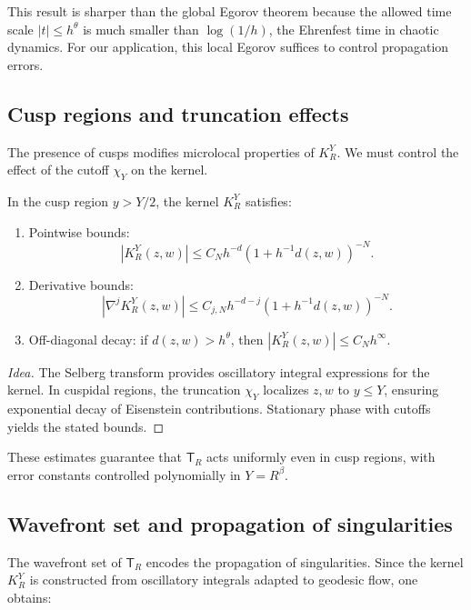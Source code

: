 This result is sharper than the global Egorov theorem because the allowed time scale $|t|\leq h^\theta$ is much smaller than $\log(1/h)$, the Ehrenfest time in chaotic dynamics. For our application, this local Egorov suffices to control propagation errors.

\subsection{Cusp regions and truncation effects}\label{subsec:micro-cusp}

The presence of cusps modifies microlocal properties of $K_R^Y$. We must control the effect of the cutoff $\chi_Y$ on the kernel.

\begin{proposition}\label{prop:cusp-estimates}
In the cusp region $y>Y/2$, the kernel $K_R^Y$ satisfies:
\begin{enumerate}
  \item Pointwise bounds:
  \[
  |K_R^Y(z,w)| \leq C_N h^{-d} (1+h^{-1}d(z,w))^{-N}.
  \]
  \item Derivative bounds:
  \[
  |\nabla^j K_R^Y(z,w)| \leq C_{j,N} h^{-d-j}(1+h^{-1}d(z,w))^{-N}.
  \]
  \item Off-diagonal decay: if $d(z,w)>h^\theta$, then $|K_R^Y(z,w)|\leq C_N h^\infty$.
\end{enumerate}
\end{proposition}

\begin{proof}[Idea]
The Selberg transform provides oscillatory integral expressions for the kernel. In cuspidal regions, the truncation $\chi_Y$ localizes $z,w$ to $y\leq Y$, ensuring exponential decay of Eisenstein contributions. Stationary phase with cutoffs yields the stated bounds.
\end{proof}

These estimates guarantee that $\mathsf{T}_R$ acts uniformly even in cusp regions, with error constants controlled polynomially in $Y=R^\beta$.

\subsection{Wavefront set and propagation of singularities}\label{subsec:micro-wavefront}

The wavefront set of $\mathsf{T}_R$ encodes the propagation of singularities. Since the kernel $K_R^Y$ is constructed from oscillatory integrals adapted to geodesic flow, one obtains:

